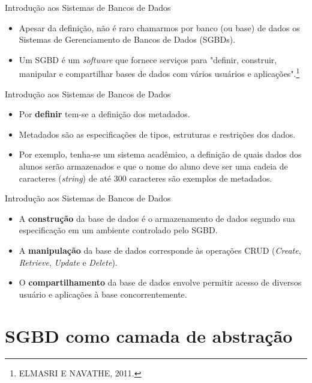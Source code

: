 \documentclass[11pt]{beamer}
\begin{document}
\begin{frame}{Introdução aos Sistemas de Bancos de Dados}
    \begin{itemize}
        \item Apesar da definição, não é raro chamarmos por banco (ou base) de dados os Sistemas de Gerenciamento de Bancos de Dados (SGBDs).
        \item Um SGBD é um \textit{software} que fornece serviços para "definir, construir, manipular e compartilhar bases de dados com vários usuários e aplicações".\footnote{ELMASRI E NAVATHE, 2011.}
    \end{itemize}
\end{frame}

\begin{frame}{Introdução aos Sistemas de Bancos de Dados}
    \begin{itemize}
        \item Por \textbf{definir} tem-se a definição dos metadados.
        \item Metadados são as especificações de tipos, estruturas e restrições dos dados.
        \item Por exemplo, tenha-se um sistema acadêmico, a definição de quais dados dos alunos serão armazenados e que o nome do aluno deve ser uma cadeia de caracteres (\textit{string}) de até 300 caracteres são exemplos de metadados.
    \end{itemize}
\end{frame}

\begin{frame}{Introdução aos Sistemas de Bancos de Dados}
    \begin{itemize}
        \item A \textbf{construção} da base de dados é o armazenamento de dados segundo sua especificação em um ambiente controlado pelo SGBD.
        \item A \textbf{manipulação} da base de dados corresponde às operações CRUD (\textit{Create}, \textit{Retrieve}, \textit{Update} e \textit{Delete}).
        \item O \textbf{compartilhamento} da base de dados envolve permitir acesso de diversos usuário e aplicações à base concorrentemente.
    \end{itemize}
\end{frame}

\section{SGBD como camada de abstração}
\end{document}
